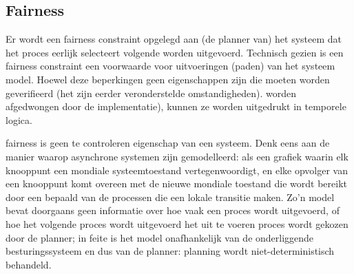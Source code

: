 \documentclass{article}
\begin{document}
	
%	
%	
%	
%	
%	
%	
%	
%	
%	
	
	
	
	
	\subsection{Fairness}
	Er wordt een fairness constraint opgelegd aan (de planner van) het systeem dat het proces eerlijk selecteert
	volgende worden uitgevoerd. Technisch gezien is een fairness constraint een voorwaarde voor uitvoeringen (paden) van het systeem
	model. Hoewel deze beperkingen geen eigenschappen zijn die moeten worden geverifieerd (het zijn eerder veronderstelde omstandigheden).
	worden afgedwongen door de implementatie), kunnen ze worden uitgedrukt in temporele logica.
	
	fairness   is geen te controleren eigenschap van een systeem. Denk eens aan de manier waarop asynchrone systemen zijn
	gemodelleerd: als een grafiek waarin elk knooppunt een mondiale systeemtoestand vertegenwoordigt, en elke opvolger van een knooppunt
	komt overeen met de nieuwe mondiale toestand die wordt bereikt door een bepaald van de processen die een lokale transitie maken.
	Zo’n model bevat doorgaans geen informatie over hoe vaak een proces wordt uitgevoerd, of hoe het volgende proces wordt uitgevoerd
	het uit te voeren proces wordt gekozen door de planner; in feite is het model onafhankelijk van de onderliggende
	besturingssysteem en dus van de planner: planning wordt niet-deterministisch behandeld.
	\cite{WahlFairness}
	
	
	
\end{document}
